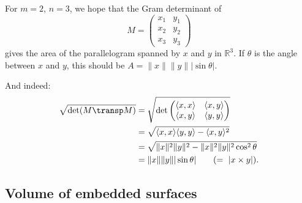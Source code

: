 \begin{example}[$m=2,\ n=3$: area of a parallelogram in $\mathbb{R}^3$]
\label{ex:gram_m2_n3_area}
For $m=2$, $n=3$, we hope that the Gram determinant of
\[M = \begin{pmatrix} x_1 & y_1 \\ x_2 & y_2 \\ x_3 & y_3 \end{pmatrix}\]
gives the area of the parallelogram spanned by $x$ and $y$ in $\mathbb{R}^3$. If $\theta$ is
the angle between $x$ and $y$, this should be $A = \lVert x\rVert\lVert y\rVert|\sin\theta|$.

\begin{center}
\end{center}

And indeed:
\[
\begin{aligned}
\sqrt{\det(M\transp M)}
  &= \sqrt{\det\begin{pmatrix} \langle x,x\rangle & \langle x,y\rangle \\
    \langle x,y\rangle & \langle y,y\rangle\end{pmatrix}} \\
  &= \sqrt{\langle x,x\rangle\langle y,y\rangle - \langle x,y\rangle^2} \\
  &= \sqrt{\lVert x\rVert^2\lVert y\rVert^2 - \lVert x\rVert^2\lVert y\rVert^2\cos^2\theta} \\
  &= \lVert x\rVert\lVert y\rVert|\sin\theta| \qquad (=\ \lvert x\times y\rvert).
\end{aligned}
\]
\end{example}

\subsection{Volume of embedded surfaces}
\label{sec:volume_embedded_surfaces}

